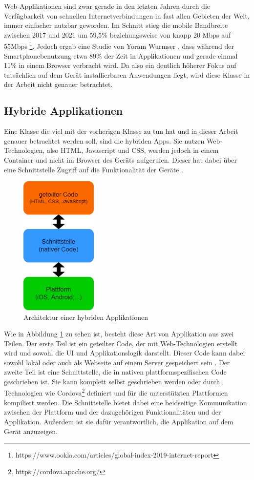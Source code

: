 Web-Applikationen sind zwar gerade in den letzten Jahren durch die Verfügbarkeit von schnellen Internetverbindungen in fast allen Gebieten der Welt, immer einfacher nutzbar geworden.
Im Schnitt stieg die mobile Bandbreite zwischen 2017 und 2021 um 59,5\% beziehungsweise von knapp 20 \ac{Mbps} auf 55\ac{Mbps} \footnote{https://www.ookla.com/articles/global-index-2019-internet-report}.
Jedoch ergab eine Studie von Yoram Wurmser \cite{report_webusage}, dass während der Smartphonebenutzung etwa 89\% der Zeit in Applikationen und gerade einmal 11\% in einem Browser verbracht wird.
Da also ein deutlich höherer Fokus auf tatsächlich auf dem Gerät installierbaren Anwendungen liegt, wird diese Klasse in der Arbeit nicht genauer betrachtet.

\subsection{Hybride Applikationen}
Eine Klasse die viel mit der vorherigen Klasse zu tun hat und in dieser Arbeit genauer betrachtet werden soll, sind die hybriden Apps.
Sie nutzen Web-Technologien, also HTML, Javascript und CSS, werden jedoch in einem Container und nicht im Browser des Geräts aufgerufen.
Dieser hat dabei über eine Schnittstelle Zugriff auf die Funktionalität der Geräte \cite{IEEE_development_classes}.

\begin{figure}[ht]
  \centering
  \includegraphics[height=7cm,keepaspectratio]{images/hybrid_architecture.drawio.png} 
  \caption{Architektur einer hybriden Applikationen}
  \label{fig:hybrid_architecture}
\end{figure}

Wie in Abbildung \ref{fig:hybrid_architecture} zu sehen ist, besteht diese Art von Applikation aus zwei Teilen.
Der erste Teil ist ein geteilter Code, der mit Web-Technologien erstellt wird und sowohl die UI und Applikationslogik darstellt. Dieser Code kann dabei sowohl lokal oder auch als Webseite auf einem Server gespeichert sein \cite{2017hybrid_approach_end}.
Der zweite Teil ist eine Schnittstelle, die in nativen plattformspezifischen Code geschrieben ist. Sie kann komplett selbst geschrieben werden oder durch Technologien wie Cordova\footnote{https://cordova.apache.org/} definiert und für die unterstützten Plattformen kompiliert werden. Die Schnittstelle bietet dabei eine beidseitige Kommunikation zwischen der Plattform und der dazugehörigen Funktionalitäten und der Applikation. Außerdem ist sie dafür verantwortlich, die Applikation auf dem Gerät anzuzeigen. 

